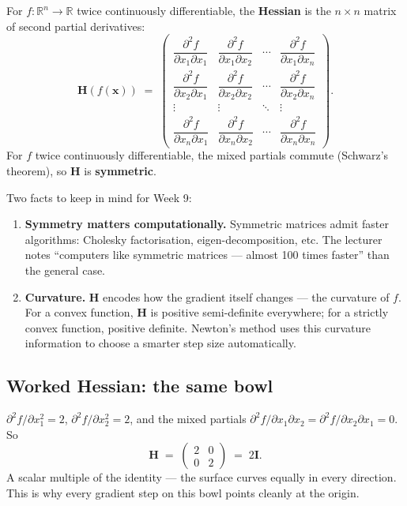 \documentclass[11pt, a4paper]{article}
\begin{document}
\begin{defbox}
For $f : \mathbb{R}^n \to \mathbb{R}$ twice continuously differentiable, the \textbf{Hessian} is the $n \times n$ matrix of second partial derivatives:
\[
\mathbf{H}(f(\mathbf{x})) \;=\;
\begin{pmatrix}
\dfrac{\partial^2 f}{\partial x_1\partial x_1} & \dfrac{\partial^2 f}{\partial x_1\partial x_2} & \cdots & \dfrac{\partial^2 f}{\partial x_1\partial x_n} \\[0.4em]
\dfrac{\partial^2 f}{\partial x_2\partial x_1} & \dfrac{\partial^2 f}{\partial x_2\partial x_2} & \cdots & \dfrac{\partial^2 f}{\partial x_2\partial x_n} \\[0.2em]
\vdots & \vdots & \ddots & \vdots \\[0.2em]
\dfrac{\partial^2 f}{\partial x_n\partial x_1} & \dfrac{\partial^2 f}{\partial x_n\partial x_2} & \cdots & \dfrac{\partial^2 f}{\partial x_n\partial x_n}
\end{pmatrix}.
\]
For $f$ twice continuously differentiable, the mixed partials commute (Schwarz's theorem), so $\mathbf{H}$ is \textbf{symmetric}.
\end{defbox}

Two facts to keep in mind for Week 9:

\begin{enumerate}
  \item \textbf{Symmetry matters computationally.} Symmetric matrices admit faster algorithms: Cholesky factorisation, eigen-decomposition, etc. The lecturer notes ``computers like symmetric matrices — almost 100 times faster'' than the general case.
  \item \textbf{Curvature.} $\mathbf{H}$ encodes how the gradient itself changes — the curvature of $f$. For a convex function, $\mathbf{H}$ is positive semi-definite everywhere; for a strictly convex function, positive definite. Newton's method uses this curvature information to choose a smarter step size automatically.
\end{enumerate}

\subsection{Worked Hessian: the same bowl}

\begin{exbox}[{Hessian of $f(x_1, x_2) = x_1^2 + x_2^2$}]
$\partial^2 f / \partial x_1^2 = 2$, $\partial^2 f / \partial x_2^2 = 2$, and the mixed partials $\partial^2 f / \partial x_1 \partial x_2 = \partial^2 f / \partial x_2 \partial x_1 = 0$. So
\[
\mathbf{H} \;=\; \begin{pmatrix} 2 & 0 \\ 0 & 2 \end{pmatrix} \;=\; 2\mathbf{I}.
\]
A scalar multiple of the identity — the surface curves equally in every direction. This is why every gradient step on this bowl points cleanly at the origin.
\end{exbox}
\end{document}
